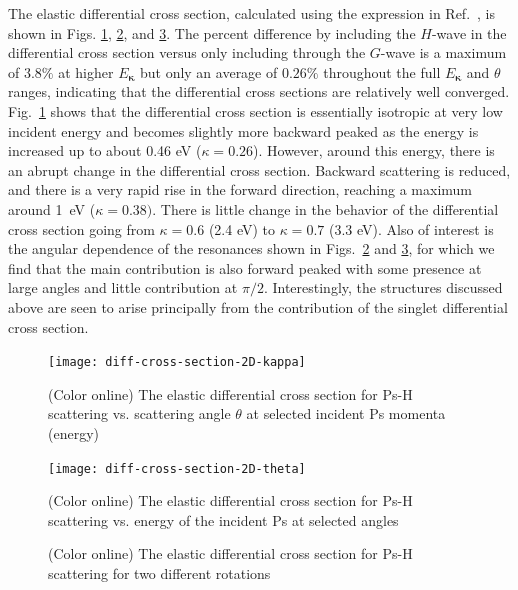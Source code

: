 \documentclass[preprint,showpacs,showkeys,preprintnumbers,amsmath,amssymb,longbibliography,pra,aps]{revtex4-1}
\begin{document}
{The elastic differential cross section, calculated using the expression in
Ref.~\cite{Bransden2003}, is shown in Figs.
\ref{fig:diff-cross-section-2D-kappa}, \ref{fig:diff-cross-section-2D-theta},
and \ref{fig:combined-diff-cross-sections}. The percent difference by including
the $H$-wave in the differential cross section versus only including through
the $G$-wave is a maximum of $3.8\%$ at higher $E_{\bm \kappa}$
but only an average of $0.26\%$ throughout the full
$E_{\bm \kappa}$ and $\theta$ ranges, indicating that the differential cross sections
are relatively well converged. Fig.~\ref{fig:diff-cross-section-2D-kappa} shows
that the differential cross section is essentially
isotropic at very low incident energy and becomes slightly more backward peaked 
as the energy is increased up to about 0.46 eV ($\kappa = 0.26$). 
However, around this energy, there is an abrupt change in the differential 
cross section. Backward scattering is reduced, and there is a very rapid
rise in the forward direction, reaching a maximum 
around 1~eV ($\kappa = 0.38)$.
There is little change in the behavior of the differential cross section
going from $\kappa = 0.6$ (2.4 eV) to $\kappa = 0.7$ (3.3 eV).
Also of interest is the angular dependence of the resonances shown in
Figs.~\ref{fig:diff-cross-section-2D-theta} and 
\ref{fig:combined-diff-cross-sections}, for which we find that the main 
contribution is also forward peaked with some presence at large angles and 
little contribution at $\pi/2$.
Interestingly, the structures discussed above are seen to arise principally
from the contribution of the singlet differential cross section.

\begin{figure}[H]
	\centering
	\texttt{[image: diff-cross-section-2D-kappa]}
	\caption{(Color online) The elastic differential cross section for Ps-H
scattering vs. scattering angle $\theta$ at selected incident Ps momenta (energy)}
	\label{fig:diff-cross-section-2D-kappa}
\end{figure}

\begin{figure}[H]
	\centering
	\texttt{[image: diff-cross-section-2D-theta]}
	\caption{(Color online) The elastic differential cross section for Ps-H
scattering vs. energy of the incident Ps at selected angles}
	\label{fig:diff-cross-section-2D-theta}
\end{figure}

\begin{figure}[H]%
    \centering
    \caption{(Color online) The elastic differential cross section for Ps-H scattering for two different rotations}%
    \label{fig:combined-diff-cross-sections}%
\end{figure}

}
\end{document}
